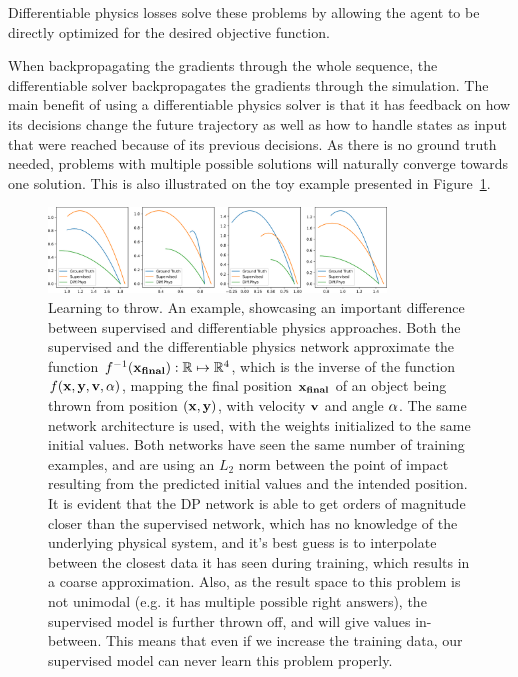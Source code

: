 \documentclass[acmtog]{techreportacmart}
\begin{document}
Differentiable physics losses solve these problems by allowing the agent to be
directly optimized for the desired objective function. 

When backpropagating the gradients through the whole sequence, the differentiable
solver backpropagates the gradients through the simulation. The main benefit of
using a differentiable physics solver is that it has feedback on how its
decisions change the future trajectory as well as how to handle states as input
that were reached because of its previous decisions. As there is no ground truth
needed, problems with multiple possible solutions will naturally converge
towards one solution. This is also illustrated on the toy example presented in 
Figure~\ref{fig:learning-to-throw}.


\begin{figure}
  \centering
  \includegraphics[width=0.8\textwidth]{throwing_results}
  \caption{Learning to throw. 
    An example, showcasing an important difference between supervised and
    differentiable physics approaches. Both the supervised and the differentiable physics
    network approximate the function $f^{-1}(\vb{x_{final}}): \mathbb{R} \mapsto
    \mathbb{R}^4$, which is the inverse of the function $f(\vb{x}, \vb{y},
    \vb{v}, \vb{\alpha})$, mapping the final position $\vb{x_{final}}$ of an
    object being thrown from position $(\vb{x}, \vb{y})$, with velocity $\vb{v}$
    and angle $\vb{\alpha}$. The same network architecture is used, with the
    weights initialized to the same initial values. Both networks have seen the
    same number of training examples, and are using an $L_2$ norm between the
    point of impact resulting from the predicted initial values and the intended
    position. It is evident that the DP network is able to get orders of
    magnitude closer than the supervised network, which has no knowledge of the
    underlying physical system, and it's best guess is to interpolate between
    the closest data it has seen during training, which results in a coarse
    approximation. Also, as the result space to this problem is not unimodal
    (e.g. it has multiple possible right answers), the supervised model
    is further thrown off, and will give values in-between. This means that even
    if we increase the training data, our supervised model can never learn this
    problem properly.
  }
  \label{fig:learning-to-throw}
\end{figure}
\end{document}
